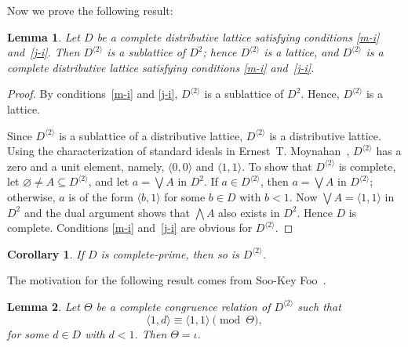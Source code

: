 \documentclass{amsart}
\theoremstyle{plain}
\newtheorem{corollary}{Corollary}
\newtheorem{lemma}{Lemma}
\theoremstyle{definition}
\theoremstyle{remark}
\numberwithin{equation}{section}
\begin{document}
Now we prove the following result:

\begin{lemma}\label{L:ds} 
   Let $D$ be a complete distributive lattice satisfying 
   conditions \eqref{m-i} and~\eqref{j-i}.  Then 
   $D^{\langle 2 \rangle}$ is a sublattice of $D^{2}$; 
   hence $D^{\langle 2 \rangle}$ is a lattice, and 
   $D^{\langle 2 \rangle}$ is a complete distributive 
   lattice satisfying conditions \eqref{m-i} and~\eqref{j-i}. 
\end{lemma}

\begin{proof} 
   By conditions~\eqref{m-i} and \eqref{j-i}, 
   $D^{\langle 2 \rangle}$ is a sublattice 
   of $D^{2}$.  Hence, $D^{\langle 2 \rangle}$ is a lattice.

   Since $D^{\langle 2 \rangle}$ is a sublattice of a distributive
   lattice, $D^{\langle 2 \rangle}$ is a distributive lattice.  Using 
   the characterization of standard ideals in Ernest~T. Moynahan~\cite{eM57},
   $D^{\langle 2 \rangle}$ has a zero and a unit element,
   namely, $\langle 0, 0 \rangle$ and $\langle 1, 1 \rangle$. 
   To show that $D^{\langle 2 \rangle}$ is complete, let 
   $\varnothing \ne A \subseteq D^{\langle 2 \rangle}$, and let 
   $a = \bigvee A$ in $D^{2}$.  If 
   $a \in D^{\langle 2 \rangle}$, then 
   $a = \bigvee A$ in $D^{\langle 2 \rangle}$; otherwise, $a$ 
   is of the form $\langle b, 1 \rangle$ for some 
   $b \in D$ with $b < 1$.  Now $\bigvee A = \langle 1, 1\rangle$ 
   in $D^{2}$ and the dual argument shows that $\bigwedge A$ also 
   exists in $D^{2}$.  Hence $D$ is complete. Conditions \eqref{m-i} 
   and~\eqref{j-i} are obvious for $D^{\langle 2 \rangle}$.
\end{proof}

\begin{corollary}\label{C:prime}
   If $D$ is complete-prime, then so is $D^{\langle 2 \rangle}$.
\end{corollary}

The motivation for the following result comes from Soo-Key Foo~\cite{sF90}.

\begin{lemma}\label{L:ccr} 
   Let $\Theta$ be a complete congruence relation of 
   $D^{\langle 2 \rangle}$ such that 
   \begin{equation}\label{E:rigid} 
      \langle 1, d \rangle \equiv \langle 1, 1 \rangle \pmod{\Theta}, 
   \end{equation} 
   for some $d \in D$ with $d < 1$. Then $\Theta = \iota$.
\end{lemma}
\end{document}
